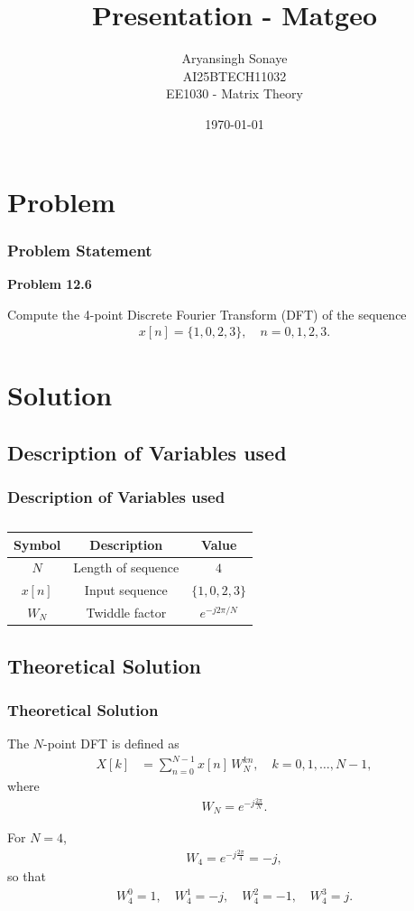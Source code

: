 \documentclass{beamer}
\title{Presentation - Matgeo}
\author{Aryansingh Sonaye \\
AI25BTECH11032 \\
EE1030 - Matrix Theory}
\date{\today}
\theoremstyle{remark}
\numberwithin{equation}{section}
\begin{document}
\begin{frame}
\titlepage
\end{frame}

\section{Problem}
\begin{frame}
\frametitle{Problem Statement}
\textbf{Problem 12.6}

Compute the 4-point Discrete Fourier Transform (DFT) of the sequence
\begin{align}
x[n] = \{1,0,2,3\}, \quad n=0,1,2,3.
\end{align}


\end{frame}

\section{Solution}
\subsection{Description of Variables used}
\begin{frame}
\frametitle{Description of Variables used}
\begin{table}[H]
\centering
\begin{tabular}{|c|c|c|}
\hline
\textbf{Symbol} & \textbf{Description} & \textbf{Value} \\
\hline
$N$ & Length of sequence & $4$ \\
\hline
$x[n]$ & Input sequence & $\{1,0,2,3\}$ \\
\hline
$W_N$ & Twiddle factor & $e^{-j2\pi/N}$ \\
\hline
\end{tabular}
\caption{} \label{}
\end{table}


\end{frame}

\subsection{Theoretical Solution }

\begin{frame}
\frametitle{Theoretical Solution}
The $N$-point DFT is defined as
\begin{align}
    X[k] &= \sum_{n=0}^{N-1} x[n] \, W_N^{kn}, \quad k=0,1,\dots,N-1,
\end{align}
where
\begin{align}
    W_N = e^{-j \tfrac{2\pi}{N}}.
\end{align}

For $N=4$,
\begin{align}
    W_4 = e^{-j \tfrac{2\pi}{4}} = -j,
\end{align}
so that
\begin{align}
    W_4^0 = 1, \quad W_4^1 = -j, \quad W_4^2 = -1, \quad W_4^3 = j.
\end{align}

\end{frame}
\end{document}
